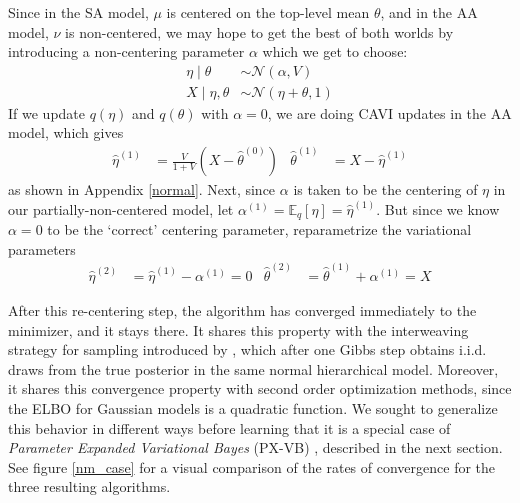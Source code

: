 \documentclass{article}
\begin{document}
Since in the SA model, $\mu$ is centered on the top-level mean $\theta$, and in the AA model, $\nu$ is non-centered, we may hope to get the best of both worlds by introducing a non-centering parameter $\alpha$ which we get to choose:
\begin{align}
\eta \mid \theta
&\sim \mathcal N(\alpha,V) \\
X\mid \eta,\theta
&\sim \mathcal N(\eta +\theta,1)
\end{align}
If we update $q(\eta)$ and $q(\theta)$ with $\alpha=0$, we are doing CAVI updates in the AA model, which gives
\begin{align*}
\widehat\eta^{(1)}
&= \frac{V}{1+V} (X - \widehat\theta^{(0)})
&
\widehat\theta^{(1)}
&=X- \widehat\eta^{(1)} 
\end{align*}
as shown in Appendix \ref{normal}. Next, since $\alpha$ is taken to be the centering of $\eta$ in our partially-non-centered model, let $\alpha^{(1)} = \mathbb E_q[\eta]= \widehat\eta^{(1)}$. But since we know $\alpha=0$ to be the `correct' centering parameter, reparametrize the variational parameters
\begin{align*}
\widehat\eta^{(2)}
&=  \widehat\eta^{(1)} - \alpha^{(1)} = 0
&
\widehat\theta^{(2)}
&=\widehat\theta^{(1)} + \alpha^{(1)} = X
\end{align*}

After this re-centering step, the algorithm has converged immediately to the minimizer, and it stays there. It shares this property with the interweaving strategy for sampling introduced by \cite{Yu}, which after one Gibbs step obtains i.i.d. draws from the true posterior in the same normal hierarchical model. Moreover, it shares this convergence property with second order optimization methods, since the ELBO for Gaussian models is a quadratic function. We sought to generalize this behavior in different ways before learning that it is a special case of {\sl Parameter Expanded Variational Bayes} (PX-VB) \cite{Qi}, described in the next section. See figure \ref{nm_case} for a visual comparison of the rates of convergence for the three resulting algorithms.
\end{document}
